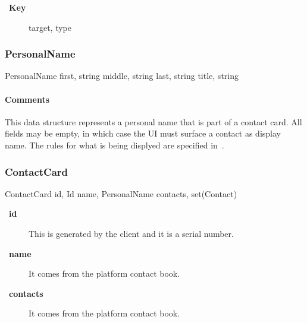 \documentclass[a4paper,10pt]{article}
\let\Item\item
\newcommand\SpecialItem{\renewcommand\item[1][]{\Item[\textbullet~\bfseries##1]}
}
\begin{document}
\SpecialItem
\begin{description}
 \item[Key] target, type
\end{description}

\subsubsection{PersonalName}

\begin{verbbox}
PersonalName
{
  first, string
  middle, string
  last, string
  title, string
}
\end{verbbox}
\begin{center}
\theverbbox
\end{center}

\begin{inparaitem}[ ]
 \item \infrastructure
\end{inparaitem}

\paragraph*{Comments}
This data structure represents a personal name that is part of a contact card. All fields may be empty, in which case the UI must surface a contact as display name. The rules 
for what is being displyed are specified in~\cite{flow_spec}.

\subsubsection{ContactCard}

\begin{verbbox}
ContactCard
{
  id, Id
  name, PersonalName
  contacts, set(Contact)
}
\end{verbbox}
\begin{center}
\theverbbox
\end{center}

\begin{inparaitem}[ ]
 \item \infrastructure
\end{inparaitem}

\SpecialItem
\begin{description}
 \item[id] This is generated by the client and it is a serial number.
 \item[name] It comes from the platform contact book.
 \item[contacts] It comes from the platform contact book.
\end{description}
\end{document}
